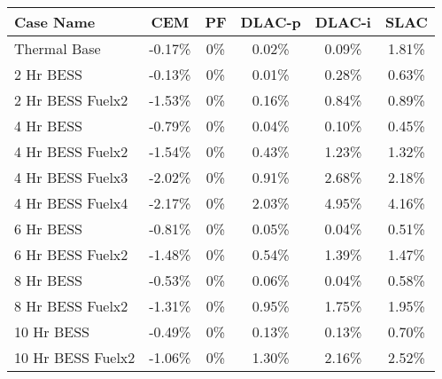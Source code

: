 \begin{tabular}{lccccc}
\toprule
Case Name & CEM & PF & DLAC-p & DLAC-i & SLAC \\
\midrule
Thermal Base & -0.17\% & 0\% & 0.02\% & 0.09\% & 1.81\% \\
2 Hr BESS & -0.13\% & 0\% & 0.01\% & 0.28\% & 0.63\% \\
2 Hr BESS Fuelx2 & -1.53\% & 0\% & 0.16\% & 0.84\% & 0.89\% \\
4 Hr BESS & -0.79\% & 0\% & 0.04\% & 0.10\% & 0.45\% \\
4 Hr BESS Fuelx2 & -1.54\% & 0\% & 0.43\% & 1.23\% & 1.32\% \\
4 Hr BESS Fuelx3 & -2.02\% & 0\% & 0.91\% & 2.68\% & 2.18\% \\
4 Hr BESS Fuelx4 & -2.17\% & 0\% & 2.03\% & 4.95\% & 4.16\% \\
6 Hr BESS & -0.81\% & 0\% & 0.05\% & 0.04\% & 0.51\% \\
6 Hr BESS Fuelx2 & -1.48\% & 0\% & 0.54\% & 1.39\% & 1.47\% \\
8 Hr BESS & -0.53\% & 0\% & 0.06\% & 0.04\% & 0.58\% \\
8 Hr BESS Fuelx2 & -1.31\% & 0\% & 0.95\% & 1.75\% & 1.95\% \\
10 Hr BESS & -0.49\% & 0\% & 0.13\% & 0.13\% & 0.70\% \\
10 Hr BESS Fuelx2 & -1.06\% & 0\% & 1.30\% & 2.16\% & 2.52\% \\
\bottomrule
\end{tabular}
